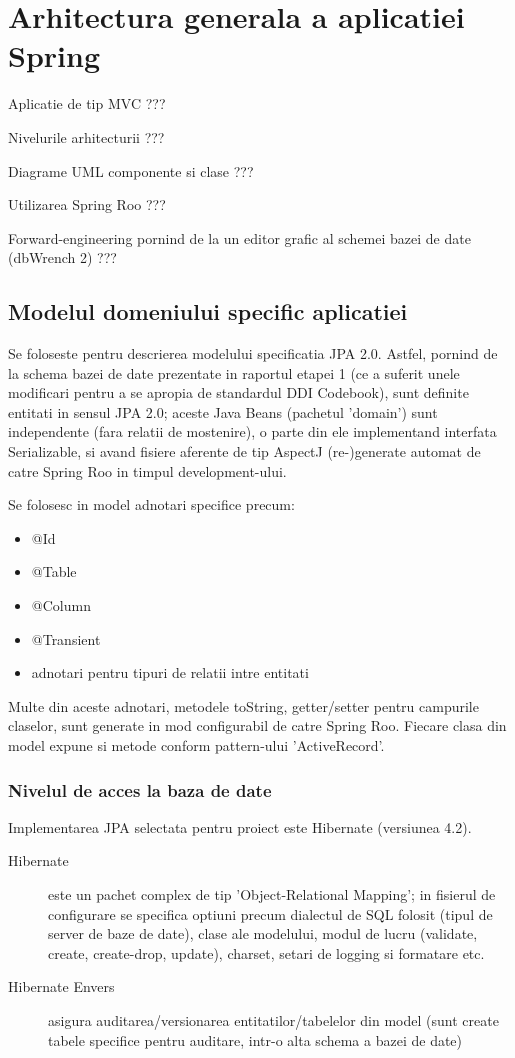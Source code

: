 \section{Arhitectura generala a aplicatiei Spring}

Aplicatie de tip MVC ???

Nivelurile arhitecturii ???

Diagrame UML componente si clase ???

Utilizarea Spring Roo ???

Forward-engineering pornind de la un editor grafic al schemei bazei de date
(dbWrench 2) ???

\subsection{Modelul domeniului specific aplicatiei}
Se foloseste pentru descrierea modelului specificatia JPA 2.0.
Astfel, pornind de la schema bazei de date prezentate in raportul etapei 1 (ce
a suferit unele modificari pentru a se apropia de standardul DDI Codebook),
sunt definite entitati in sensul JPA 2.0; aceste Java Beans (pachetul
'domain') sunt independente (fara relatii de mostenire), o parte din ele
implementand interfata Serializable, si avand fisiere aferente de tip AspectJ
(re-)generate automat de catre Spring Roo in timpul development-ului.

Se folosesc in model adnotari specifice precum:
\begin{itemize}
  \item @Id
  \item @Table
  \item @Column
  \item @Transient
  \item adnotari pentru tipuri de relatii intre entitati
\end{itemize}

Multe din aceste adnotari, metodele toString, getter/setter pentru
campurile claselor, sunt generate in mod configurabil de catre Spring Roo.
Fiecare clasa din model expune si metode conform pattern-ului 'ActiveRecord'. 

\subsubsection{Nivelul de acces la baza de date}
Implementarea JPA selectata pentru proiect este Hibernate (versiunea 4.2).
\begin{description}
\item[Hibernate] este un pachet complex de tip 'Object-Relational Mapping';
in fisierul de configurare se specifica optiuni precum dialectul de SQL folosit
(tipul de server de baze de date), clase ale modelului, modul de lucru
(validate, create, create-drop, update), charset, setari de logging si formatare
etc.
\item[Hibernate Envers] asigura auditarea/versionarea entitatilor/tabelelor din
model (sunt create tabele specifice pentru auditare, intr-o alta schema a bazei
de date)
\end{description}

